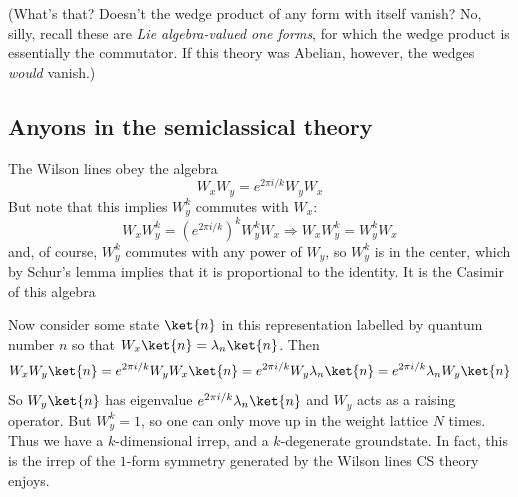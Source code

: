 \documentclass{report}
\begin{document}
(What's that? Doesn't the wedge product of any form with itself vanish? No, silly, 
recall these are \textit{Lie algebra-valued one forms}, for which the wedge product 
is essentially the commutator. If this theory was Abelian, however, the wedges 
\textit{would} vanish.)

\subsection{Anyons in the semiclassical theory}

The Wilson lines obey the algebra 
\begin{equation*}
	W_x W_y = e^{2\pi i / k} W_y W_x
\end{equation*}
But note that this implies $ W_y^k $ commutes with $ W_x $:
\begin{equation*}
	W_x W_y^k = (e^{2\pi i / k})^k W_y^k W_x
		\Longrightarrow W_x W_y^k  = W_y^k W_x
\end{equation*}
and, of course, $ W_y^k $ commutes with any power of $ W_y $, so $ W_y^k $ is 
in the center, which by Schur's lemma implies that it is proportional to the 
identity. It is the Casimir of this algebra

Now consider some state $ \ket{n} $ in this representation labelled by quantum 
number $ n $ so that $ W_x\ket{n} = \lambda_n \ket{n} $. Then
\begin{equation*}
	W_x W_y \ket{n} = e^{2\pi i / k} W_y W_x \ket{n} 
		= e^{2\pi i / k} W_y \lambda_n \ket{n} 
		= e^{2\pi i/ k}\lambda_n W_y \ket{n}
\end{equation*}
So $ W_y\ket{n} $ has eigenvalue $ e^{2\pi i / k}\lambda_n \ket{n} $ and $ W_y $
acts as a raising operator. But $ W_y^k = 1 $, so one can only move up in the 
weight lattice $ N $ times. Thus we have a $ k $-dimensional irrep, and a 
$ k $-degenerate groundstate. In fact, this is the irrep of the $ 1 $-form 
symmetry generated by the Wilson lines CS theory enjoys.
\end{document}

